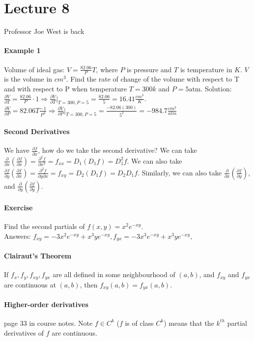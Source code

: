 \documentclass[tikz,10pt,letter]{article}
\theoremstyle{plain}
\theoremstyle{definition}
\begin{document}
\section*{Lecture 8}
Professor Joe West is back
\paragraph{Example 1}
Volume of ideal gas: $V=\frac{82.06}{P}T$, where $P$ is pressure and $T$ is temperature in $K$. $V$ is the volume in $cm^3$. Find the rate of change of the volume with respect to T and with respect to P when temperature $T=300k$ and $P=5\text{atm}$. Solution: $\frac{\partial V}{\partial T}=\frac{82.06}{P}\cdot1\Rightarrow\frac{\partial V}{\partial T}|_{T=300, P=5}=\frac{82.06}{5}=16.41\frac{cm^3}{K}$. $\frac{\partial V}{\partial P}=82.06T\frac{-1}{P^2}\Rightarrow \frac{\partial V}{\partial P}|_{T=300,P=5}=\frac{-82.06(300)}{5^2}=-984.7\frac{cm^3}{atm}$

\paragraph{Second Derivatives}
We have $\frac{\partial f}{\partial x}$, how do we take the second derivative? We can take $\frac{\partial}{\partial x}\left(\frac{\partial f}{\partial x}\right)=\frac{\partial^2 f}{\partial x^2}=f_{xx}=D_1(D_1f)=D_1^2f$. We can also take $\frac{\partial f}{\partial y}\left(\frac{\partial f}{\partial x}\right)=\frac{\partial^2f}{\partial y\partial x}=f_{xy}=D_2(D_1f)=D_2D_1f$. Similarly, we can also take $\frac{\partial}{\partial x}\left(\frac{\partial f}{\partial y}\right)$, and $\frac{\partial}{\partial y}\left(\frac{\partial f}{\partial y}\right)$. 
\paragraph{Exercise}
Find the second partials of $f(x,y)=x^2e^{-xy}$. \\ 
Answers: $f_{xy}=-3x^2e^{-xy}+x^3ye^{-xy}, f_{yx}=-3x^3e^{-xy}+x^3ye^{-xy}, $

\paragraph{Clairaut's Theorem}
If $f_x,f_y,f_{xy},f_{yx}$ are all defined in some neighbourhood of $(a,b)$, and $f_{xy}$ and $f_{yx}$ are continuous at $(a,b)$, then $f_{xy}(a,b)=f_{yx}(a,b)$. 

\paragraph{Higher-order derivatives}
page 33 in course notes. Note $f\in C^k$ ($f$ is of class $C^k$) means that the $k^{th}$ partial derivatives of $f$ are continuous. 
\end{document}
